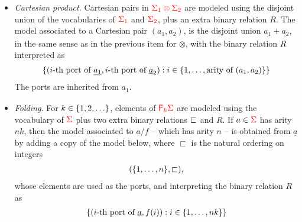 \begin{definition}
\begin{itemize}
        \item \emph{Cartesian product.}   Cartesian pairs in  ${\color{red}{\Sigma_1 \otimes \Sigma_2}}$ are modeled  using the disjoint union of the vocabularies of ${\color{red}{\Sigma_1}}$ and ${\color{red}{\Sigma_2}}$, plus an extra binary relation $R$.  
            The model associated to a Cartesian pair   $ (a_1,a_2)$,  is      the disjoint union $\underline{a_1} +  \underline {a_2}$, in the same sense as in the previous item for $\otimes$,  with the binary relation $R$ interpreted as 
                \begin{align*}
                    \{(\text{$i$-th port of $\underline {a_1}$}, \text{$i$-th port of $\underline a_2$}): i \in \{1,\ldots,\text{arity of $(a_1,a_2)$}\}\} 
                \end{align*}
                The ports are inherited from   $\underline {a_1}$.
        \item \emph{Folding.}   For $k \in \{1,2,\ldots\}$, elements of   ${\color{red}{\mathsf F_{k}}}{\color{red}{\Sigma}}$ are modeled using the  vocabulary of ${\color{red}{\Sigma}}$ plus two extra binary relations $\sqsubset$ and $R$. If $a \in {\color{red}{\Sigma}}$ has arity $nk$, then the model associated to $a/f$ -- which has arity $n$ --   is obtained from  $\underline{a}$ by adding a copy of the model below, where $\sqsubset$ is the natural ordering on integers
                \begin{align*}
                (\{1,\ldots,n\}, \sqsubset),
                \end{align*}
whose elements are used as the ports, and interpreting the binary relation $R$ as
        \begin{align*}
        \{(\text{$i$-th port of $\underline a$},f(i)) : i \in \{1,\ldots,nk\}\}
        \end{align*}
                

\end{itemize}
\end{definition}
